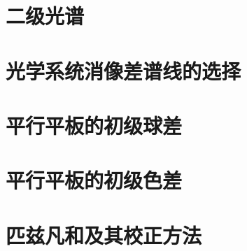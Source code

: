 \section{二级光谱}

\section{光学系统消像差谱线的选择}

\section{平行平板的初级球差}

\section{平行平板的初级色差}

\section{匹兹凡和及其校正方法}